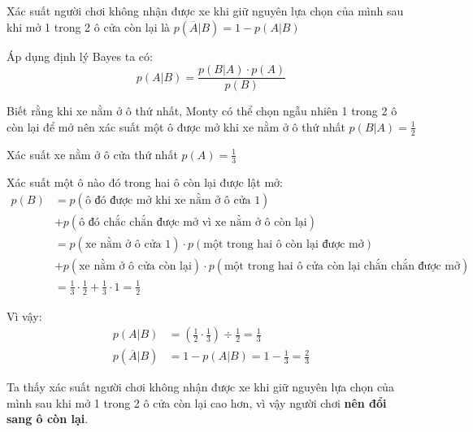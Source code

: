 \documentclass[a4paper, 12pt]{article}  %
\begin{document}
Xác suất người chơi không nhận được xe khi giữ nguyên lựa chọn của mình sau khi mở 1 trong 2 ô cửa còn lại là $p(\overline{A} | B) = 1 - p(A|B)$

Áp dụng định lý Bayes ta có:
\[p(A|B) = \frac{p(B|A) \cdot p(A)}{p(B)}\]

Biết rằng khi xe nằm ở ô thứ nhất, Monty có thể chọn ngẫu nhiên 1 trong 2 ô còn lại để mở nên xác suất một ô được mở khi xe nằm ở ô thứ nhất $p(B|A)=\frac{1}{2}$

Xác suất xe nằm ở ô cửa thứ nhất $p(A) = \frac{1}{3}$

Xác suất một ô nào đó trong hai ô còn lại được lật mở:
\begin{align*}
    p(B)&= p(\text{ô đó được mở khi xe nằm ở ô cửa 1})\\
    &+ p(\text{ô đó chắc chắn được mở vì xe nằm ở ô còn lại})\\
    &= p(\text{xe nằm ở ô cửa 1}) \cdot p(\text{một trong hai ô còn lại được mở})\\
    & + p(\text{xe nằm ở ô cửa còn lại})\cdot p(\text{một trong hai ô cửa còn lại chắn chắn được mở})\\
    &= \frac{1}{3} \cdot \frac{1}{2} + \frac{1}{3} \cdot 1 = \frac{1}{2}
\end{align*}

Vì vậy:
\begin{align*}
    p(A|B) &= (\frac{1}{2} \cdot \frac{1}{3}) \div \frac{1}{2} = \frac{1}{3}\\
    p(\overline{A} | B) &= 1 - p(A | B) = 1 - \frac{1}{3} = \frac{2}{3}
\end{align*}

Ta thấy xác suất người chơi không nhận được xe khi giữ nguyên lựa chọn của mình sau khi mở 1 trong 2 ô cửa còn lại cao hơn, vì vậy người chơi \textbf{nên đổi sang ô còn lại}.
\end{document}
